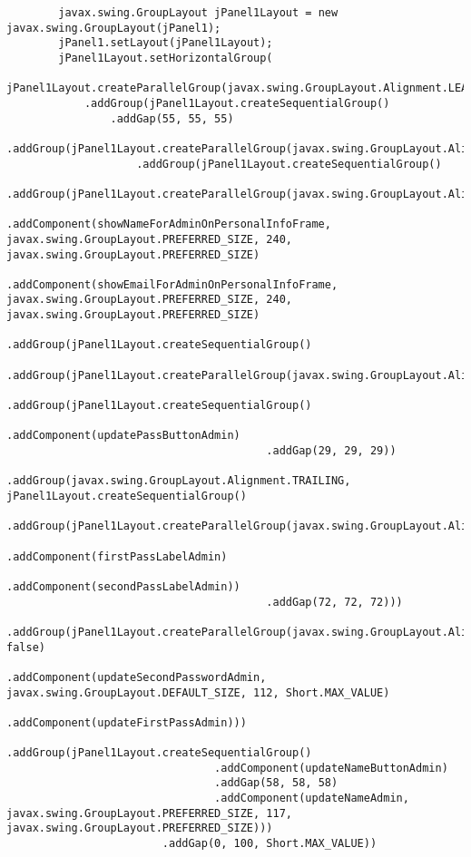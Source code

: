 \documentclass[12pt,a4paper]{article}
\begin{document}
\begin{lstlisting}
        javax.swing.GroupLayout jPanel1Layout = new javax.swing.GroupLayout(jPanel1);
        jPanel1.setLayout(jPanel1Layout);
        jPanel1Layout.setHorizontalGroup(
            jPanel1Layout.createParallelGroup(javax.swing.GroupLayout.Alignment.LEADING)
            .addGroup(jPanel1Layout.createSequentialGroup()
                .addGap(55, 55, 55)
                .addGroup(jPanel1Layout.createParallelGroup(javax.swing.GroupLayout.Alignment.LEADING)
                    .addGroup(jPanel1Layout.createSequentialGroup()
                        .addGroup(jPanel1Layout.createParallelGroup(javax.swing.GroupLayout.Alignment.LEADING)
                            .addComponent(showNameForAdminOnPersonalInfoFrame, javax.swing.GroupLayout.PREFERRED_SIZE, 240, javax.swing.GroupLayout.PREFERRED_SIZE)
                            .addComponent(showEmailForAdminOnPersonalInfoFrame, javax.swing.GroupLayout.PREFERRED_SIZE, 240, javax.swing.GroupLayout.PREFERRED_SIZE)
                            .addGroup(jPanel1Layout.createSequentialGroup()
                                .addGroup(jPanel1Layout.createParallelGroup(javax.swing.GroupLayout.Alignment.LEADING)
                                    .addGroup(jPanel1Layout.createSequentialGroup()
                                        .addComponent(updatePassButtonAdmin)
                                        .addGap(29, 29, 29))
                                    .addGroup(javax.swing.GroupLayout.Alignment.TRAILING, jPanel1Layout.createSequentialGroup()
                                        .addGroup(jPanel1Layout.createParallelGroup(javax.swing.GroupLayout.Alignment.TRAILING)
                                            .addComponent(firstPassLabelAdmin)
                                            .addComponent(secondPassLabelAdmin))
                                        .addGap(72, 72, 72)))
                                .addGroup(jPanel1Layout.createParallelGroup(javax.swing.GroupLayout.Alignment.LEADING, false)
                                    .addComponent(updateSecondPasswordAdmin, javax.swing.GroupLayout.DEFAULT_SIZE, 112, Short.MAX_VALUE)
                                    .addComponent(updateFirstPassAdmin)))
                            .addGroup(jPanel1Layout.createSequentialGroup()
                                .addComponent(updateNameButtonAdmin)
                                .addGap(58, 58, 58)
                                .addComponent(updateNameAdmin, javax.swing.GroupLayout.PREFERRED_SIZE, 117, javax.swing.GroupLayout.PREFERRED_SIZE)))
                        .addGap(0, 100, Short.MAX_VALUE))

\end{lstlisting}
\end{document}

